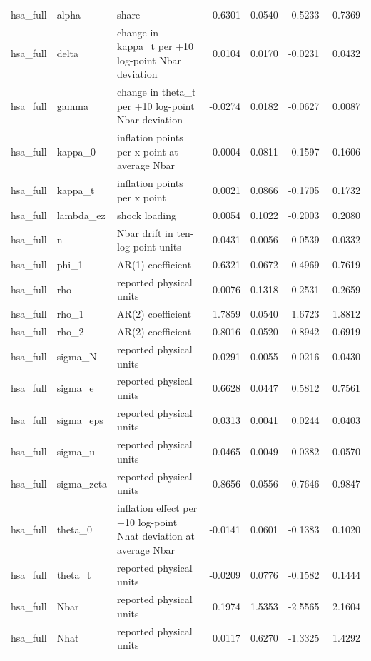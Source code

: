 \begin{tabular}{lllrrrr}
hsa\_full & alpha & share & 0.6301 & 0.0540 & 0.5233 & 0.7369 \\
hsa\_full & delta & change in kappa\_t per +10 log-point Nbar deviation & 0.0104 & 0.0170 & -0.0231 & 0.0432 \\
hsa\_full & gamma & change in theta\_t per +10 log-point Nbar deviation & -0.0274 & 0.0182 & -0.0627 & 0.0087 \\
hsa\_full & kappa\_0 & inflation points per x point at average Nbar & -0.0004 & 0.0811 & -0.1597 & 0.1606 \\
hsa\_full & kappa\_t & inflation points per x point & 0.0021 & 0.0866 & -0.1705 & 0.1732 \\
hsa\_full & lambda\_ez & shock loading & 0.0054 & 0.1022 & -0.2003 & 0.2080 \\
hsa\_full & n & Nbar drift in ten-log-point units & -0.0431 & 0.0056 & -0.0539 & -0.0332 \\
hsa\_full & phi\_1 & AR(1) coefficient & 0.6321 & 0.0672 & 0.4969 & 0.7619 \\
hsa\_full & rho & reported physical units & 0.0076 & 0.1318 & -0.2531 & 0.2659 \\
hsa\_full & rho\_1 & AR(2) coefficient & 1.7859 & 0.0540 & 1.6723 & 1.8812 \\
hsa\_full & rho\_2 & AR(2) coefficient & -0.8016 & 0.0520 & -0.8942 & -0.6919 \\
hsa\_full & sigma\_N & reported physical units & 0.0291 & 0.0055 & 0.0216 & 0.0430 \\
hsa\_full & sigma\_e & reported physical units & 0.6628 & 0.0447 & 0.5812 & 0.7561 \\
hsa\_full & sigma\_eps & reported physical units & 0.0313 & 0.0041 & 0.0244 & 0.0403 \\
hsa\_full & sigma\_u & reported physical units & 0.0465 & 0.0049 & 0.0382 & 0.0570 \\
hsa\_full & sigma\_zeta & reported physical units & 0.8656 & 0.0556 & 0.7646 & 0.9847 \\
hsa\_full & theta\_0 & inflation effect per +10 log-point Nhat deviation at average Nbar & -0.0141 & 0.0601 & -0.1383 & 0.1020 \\
hsa\_full & theta\_t & reported physical units & -0.0209 & 0.0776 & -0.1582 & 0.1444 \\
hsa\_full & Nbar & reported physical units & 0.1974 & 1.5353 & -2.5565 & 2.1604 \\
hsa\_full & Nhat & reported physical units & 0.0117 & 0.6270 & -1.3325 & 1.4292 \\

\end{tabular}
